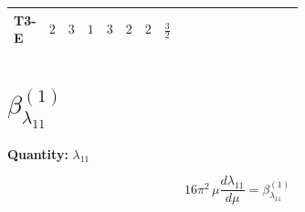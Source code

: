 \documentclass[8pt]{article}
\begin{document}
\begin{landscape}
\begin{longtable}{@{}llcccccc >{\raggedright\arraybackslash}p{0.21\linewidth} >{\raggedright\arraybackslash}p{0.21\linewidth} >{\raggedright\arraybackslash}p{0.21\linewidth}@{}}
T3-E & $2$ & $3$ & $1$ & $3$ & $2$ & $2$ & $\frac{3}{2}$ & \scriptsize\adjustbox{max width=\linewidth}{$\begin{gathered} +{\lambda_{12}^{(1)}} {\lambda_{12}^{(\times)}}\end{gathered}$} & \scriptsize\adjustbox{max width=\linewidth}{$\begin{gathered} +12 {\lambda_{12}^{(A)}}^2\end{gathered}$} & \scriptsize\adjustbox{max width=\linewidth}{$\begin{gathered} -\frac{{\lambda_{12}^{(\times)}}^2}{2}\end{gathered}$} \\
\midrule
\bottomrule
\end{longtable}
\clearpage
\section*{$\beta_{\lambda_{11}}^{(1)}$}
\noindent\textbf{Quantity: }$\lambda_{11}$\par\smallskip
\[16\pi^2\,\mu\frac{d \lambda_{11}}{d\mu}=\beta_{\lambda_{11}}^{(1)}\]

\end{landscape}
\end{document}

